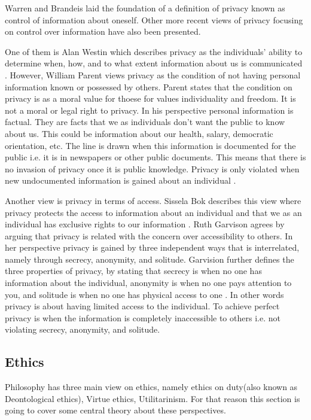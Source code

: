 Warren and Brandeis laid the foundation of a definition of privacy known as control of information about oneself. Other more recent views of privacy focusing on control over information have also been presented.

One of them is Alan Westin which describes privacy as the individuals' ability to determine when, how, and to what extent information about us is communicated \cite{westin:1969}. 
However, William Parent views privacy as the condition of not having personal information known or possessed by others. Parent states that the condition on privacy is as a moral value for thoese for values individuality and freedom. It is not a moral or legal right to privacy. In his perspective personal information is factual. They are facts that we as individuals don't want the public to know about us. This could be information about our health, salary, democratic orientation, etc. The line is drawn when this information is documented for the public i.e. it is in newspapers or other public documents. This means that there is no invasion of privacy once it is public knowledge. Privacy is only violated when new undocumented information is gained about an individual \cite{parent:1983}. 

Another view is privacy in terms of access. Sissela Bok describes this view where privacy protects the access to information about an individual and that we as an individual has exclusive rights to our information  \cite{bok:1982}. Ruth Garvison agrees by arguing that privacy is related with the concern over accessibility to others. In her perspective privacy is gained by three independent ways that is interrelated, namely through secrecy, anonymity, and solitude. Garvision further defines the three properties of privacy, by stating that secrecy is when no one has information about the individual, anonymity is when no one pays attention to you, and solitude is when no one has physical access to one \cite{gavison:1980}.  
In other words privacy is about having limited access to the individual. To achieve perfect privacy is when the information is completely inaccessible to others i.e. not violating secrecy, anonymity, and solitude. 

\subsection{Ethics}
Philosophy has three main view on ethics, namely ethics on duty(also known as Deontological ethics), Virtue ethics, Utilitarinism. For that reason this section is going to cover some central theory about these perspectives.

